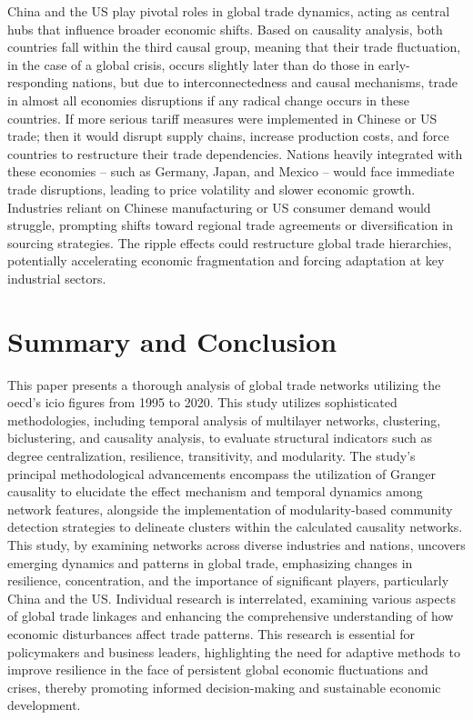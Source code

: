 \documentclass[preprint, 3p,
authoryear]{elsarticle} %
\begin{document}
China and the US play pivotal roles in global trade dynamics, acting as
central hubs that influence broader economic shifts. Based on causality
analysis, both countries fall within the third causal group, meaning
that their trade fluctuation, in the case of a global crisis, occurs
slightly later than do those in early-responding nations, but due to
interconnectedness and causal mechanisms, trade in almost all economies
disruptions if any radical change occurs in these countries. If more
serious tariff measures were implemented in Chinese or US trade; then it
would disrupt supply chains, increase production costs, and force
countries to restructure their trade dependencies. Nations heavily
integrated with these economies -- such as Germany, Japan, and Mexico --
would face immediate trade disruptions, leading to price volatility and
slower economic growth. Industries reliant on Chinese manufacturing or
US consumer demand would struggle, prompting shifts toward regional
trade agreements or diversification in sourcing strategies. The ripple
effects could restructure global trade hierarchies, potentially
accelerating economic fragmentation and forcing adaptation at key
industrial sectors.

\section{Summary and Conclusion}\label{summary-and-conclusion}

This paper presents a thorough analysis of global trade networks
utilizing the \gls{oecd}'s \gls{icio} figures from 1995 to 2020. This
study utilizes sophisticated methodologies, including temporal analysis
of multilayer networks, clustering, biclustering, and causality
analysis, to evaluate structural indicators such as degree
centralization, resilience, transitivity, and modularity. The study's
principal methodological advancements encompass the utilization of
Granger causality to elucidate the effect mechanism and temporal
dynamics among network features, alongside the implementation of
modularity-based community detection strategies to delineate clusters
within the calculated causality networks. This study, by examining
networks across diverse industries and nations, uncovers emerging
dynamics and patterns in global trade, emphasizing changes in
resilience, concentration, and the importance of significant players,
particularly China and the US. Individual research is interrelated,
examining various aspects of global trade linkages and enhancing the
comprehensive understanding of how economic disturbances affect trade
patterns. This research is essential for policymakers and business
leaders, highlighting the need for adaptive methods to improve
resilience in the face of persistent global economic fluctuations and
crises, thereby promoting informed decision-making and sustainable
economic development.
\end{document}
